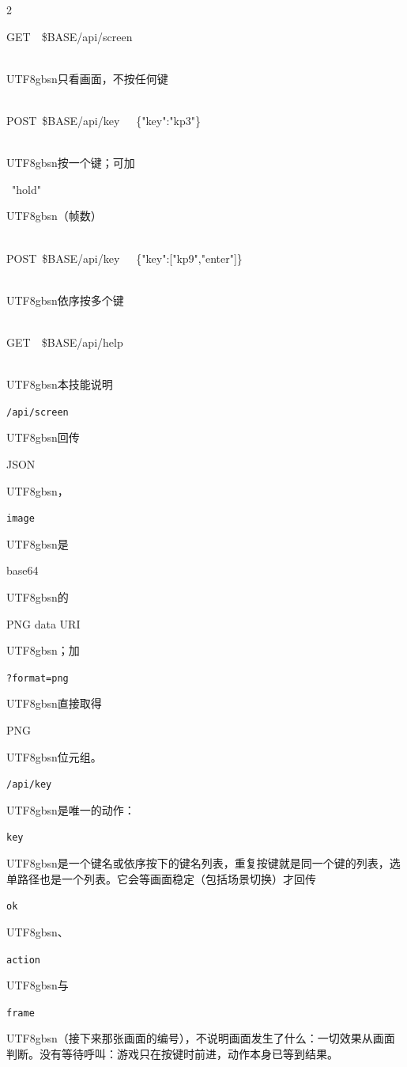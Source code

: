 \begin{paracol}{2}
{\ttfamily\scriptsize\raggedright\noindent GET\ \ \$BASE/api/screen\ \ \ \ \ \ \ \ \ \ \ \ \ \ \ \ \ \ \ \ \ \ \ \\\ \ \ \ \begin{CJK}{UTF8}{gbsn}只看画面，不按任何键\end{CJK}\\POST\ \$BASE/api/key\ \ \ \{"key":"kp3"\}\ \ \ \ \ \ \ \ \ \ \\\ \ \ \ \begin{CJK}{UTF8}{gbsn}按一个键；可加\end{CJK}\ "hold"\begin{CJK}{UTF8}{gbsn}（帧数）\end{CJK}\\POST\ \$BASE/api/key\ \ \ \{"key":["kp9","enter"]\}\\\ \ \ \ \begin{CJK}{UTF8}{gbsn}依序按多个键\end{CJK}\\GET\ \ \$BASE/api/help\ \ \ \ \ \ \ \ \ \ \ \ \ \ \ \ \ \ \ \ \ \ \ \ \ \\\ \ \ \ \begin{CJK}{UTF8}{gbsn}本技能说明\end{CJK}\par}
\texttt{/api/screen} \begin{CJK}{UTF8}{gbsn}回传\end{CJK} JSON\begin{CJK}{UTF8}{gbsn}，\end{CJK}\texttt{image} \begin{CJK}{UTF8}{gbsn}是\end{CJK} base64 \begin{CJK}{UTF8}{gbsn}的\end{CJK} PNG data URI\begin{CJK}{UTF8}{gbsn}；加\end{CJK} \texttt{?format=png} \begin{CJK}{UTF8}{gbsn}直接取得\end{CJK} PNG \begin{CJK}{UTF8}{gbsn}位元组。\end{CJK}\texttt{/api/key} \begin{CJK}{UTF8}{gbsn}是唯一的动作：\end{CJK}\texttt{key} \begin{CJK}{UTF8}{gbsn}是一个键名或依序按下的键名列表，重复按键就是同一个键的列表，选单路径也是一个列表。它会等画面稳定（包括场景切换）才回传\end{CJK} \texttt{ok}\begin{CJK}{UTF8}{gbsn}、\end{CJK}\texttt{action} \begin{CJK}{UTF8}{gbsn}与\end{CJK} \texttt{frame}\begin{CJK}{UTF8}{gbsn}（接下来那张画面的编号），不说明画面发生了什么：一切效果从画面判断。没有等待呼叫：游戏只在按键时前进，动作本身已等到结果。\end{CJK}\par

\end{paracol}
